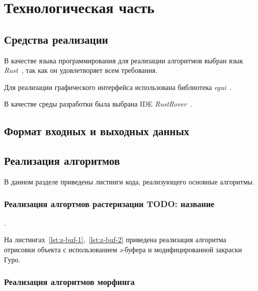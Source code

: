 \chapter{Технологическая часть}


\section{Средства реализации}
В качестве языка программирования для реализации алгоритмов выбран язык \textit{Rust}~\cite{rustbook}, так как он удовлетворяет всем требования.

Для реализации графического интерфейса использована библиотека \textit{egui}~\cite{egui}.

В качестве среды разработки была выбрана IDE \textit{RustRover}~\cite{rustrover}.


\section{Формат входных и выходных данных}


\section{Реализация алгоритмов}
В данном разделе приведены листинги кода, реализующего основные алгоритмы.

\subsection{Реализация алгортмов растеризации TODO: название}.

На листингах~\ref{lst:z-buf-1},~\ref{lst:z-buf-2} приведена реализация алгоритма отрисовки объекта с использованием \textit{z}-буфера и модифицированной закраски Гуро.





\subsection{Реализация алгоритмов морфинга}


